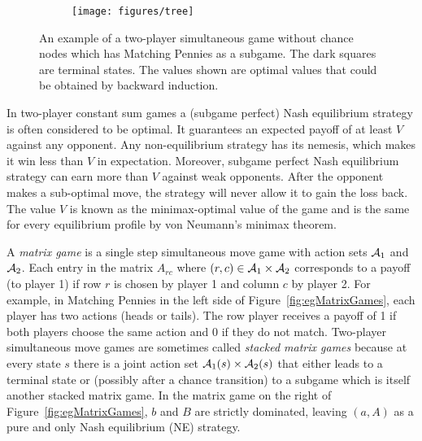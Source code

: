 \begin{figure}[t!]
\centering
\begin{subfigure}{12cm}
\centering
\texttt{[image: figures/tree]}\\
\end{subfigure}%
\caption{An example of a two-player simultaneous game without chance nodes which has Matching Pennies as a subgame. %
The dark squares are terminal states. The values shown are optimal values that could be obtained by backward induction.\\
\label{fig:example}}
\end{figure}
In two-player constant sum games a (subgame perfect) Nash equilibrium strategy is often considered to be optimal. It guarantees an expected payoff of at least $V$ against any opponent. Any non-equilibrium strategy has its nemesis, which makes it win less
than $V$ in expectation. Moreover, subgame perfect Nash equilibrium strategy can earn more than $V$ against weak opponents. After the
opponent makes a sub-optimal move, the strategy will never allow it to gain the loss back.
The value $V$ is known as the minimax-optimal value of the game
and is the same for every equilibrium profile by von Neumann's minimax theorem.


A {\it matrix game} is a single step simultaneous move game with action sets $\mathcal{A}_1$ and $\mathcal{A}_2$.
Each entry in the matrix $A_{rc}$ where $(r,c) \in \mathcal{A}_1 \times \mathcal{A}_2$ corresponds to a payoff (to player 1) if row $r$ is
chosen by player 1 and column $c$ by player 2.
For example, in Matching Pennies in the left side of Figure~\ref{fig:egMatrixGames}, each player has two actions (heads or tails).
The row player receives a payoff of 1
if both players choose the same action and 0 if they do not match.
Two-player simultaneous move games are sometimes called {\it stacked matrix games} because at every state
$s$ there is a joint action set $\mathcal{A}_1(s) \times \mathcal{A}_2(s)$ that either leads to a terminal state or (possibly after a
chance transition) to a subgame which is itself another stacked matrix game.
In the matrix game on the right of Figure~\ref{fig:egMatrixGames}, $b$ and $B$ are strictly dominated, leaving $(a,A)$ as a
pure and only Nash equilibrium (NE) strategy.

